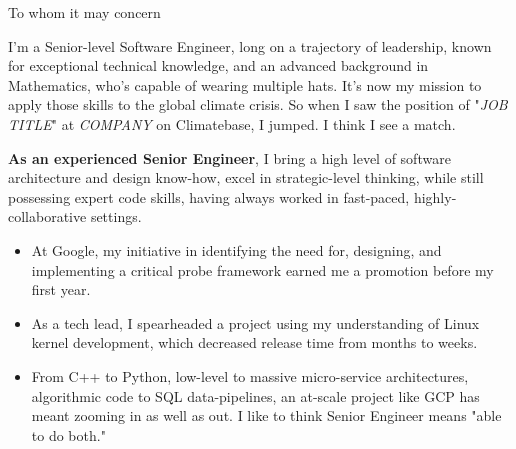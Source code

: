 \documentclass[sans, a4paper, 11pt]{article}
\newcommand{\cvcolor}[1]{{\color{MidnightBlue}#1}}
\renewcommand{\hl}[1]{\cvcolor{\textbf{#1}}}
\begin{document}
\begin{adjustwidth}{40pt}{40pt}

  To whom it may concern\par \bigskip

  I'm a Senior-level Software Engineer, long on a trajectory of leadership,
  known for exceptional technical knowledge, and an advanced background in
  Mathematics, who's capable of wearing multiple hats.
  It's now my mission to apply those skills to the global climate crisis. So
  when I saw the position of "\emph{JOB TITLE}" at \emph{COMPANY} on
  Climatebase, I jumped. I think I see a match. \medskip


  \hl{As an experienced Senior Engineer}, I bring a high level of software
  architecture and design know-how, excel in strategic-level thinking, while
  still possessing expert code skills, having always worked in fast-paced,
  highly-collaborative settings.
  \begin{itemize}
    \item At Google, my initiative in identifying the need for, designing, and
      implementing a critical probe framework earned me a promotion before my
      first year.
    \item As a tech lead, I spearheaded a project using my understanding of
      Linux kernel development, which decreased release time from months to
      weeks.
    \item From C++ to Python, low-level to massive micro-service architectures,
      algorithmic code to SQL data-pipelines, an at-scale project like GCP has
      meant zooming in as well as out. I like to think Senior Engineer means
      "able to do both."
  \end{itemize} \medskip


\end{adjustwidth}
\end{document}
